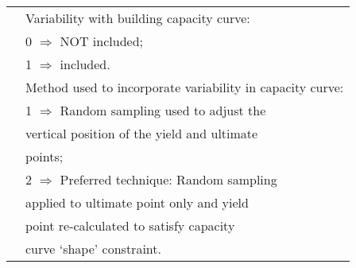 \begin{supertabular}{lp{0.6\textwidth}}
   &   Variability with building capacity curve: \\
 & \hspace{0.5em} 0 $\Rightarrow$ NOT included; \\
 & \hspace{0.5em}  1 $\Rightarrow$ included.    \\
 & Method used to incorporate variability in capacity curve: \\
 & \hspace{0.5em} 1 $\Rightarrow$ Random sampling used to adjust the \\
& \hspace{2.8em} vertical position of the yield and ultimate \\
& \hspace{2.8em} points; \\
 & \hspace{0.5em} 2 $\Rightarrow$ Preferred technique: Random sampling \\
& \hspace{2.8em} applied to ultimate point only and yield \\
& \hspace{2.8em}  point re-calculated to satisfy capacity \\
& \hspace{2.8em}  curve `shape' constraint. \\


\end{supertabular}

